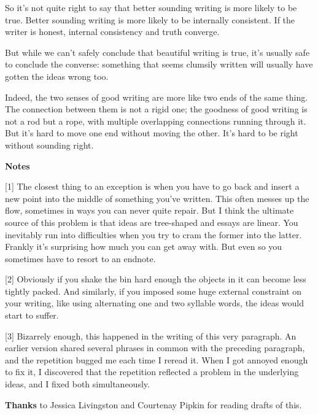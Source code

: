 So it's not quite right to say that better sounding
writing is more likely to be true. Better sounding
writing is more likely to be internally consistent. If
the writer is honest, internal consistency and truth
converge.

But while we can't safely conclude that beautiful writing
is true, it's usually safe to conclude the converse:
something that seems clumsily written will usually have
gotten the ideas wrong too.

Indeed, the two senses of good writing are more like two
ends of the same thing. The connection between them is
not a rigid one; the goodness of good writing is not a
rod but a rope, with multiple overlapping connections
running through it. But it's hard to move one end without
moving the other. It's hard to be right without sounding
right.












\textbf{Notes}

[1]
The closest thing to an exception is when you have
to go back and insert a new point into the middle of
something you've written. This often messes up the flow,
sometimes in ways you can never quite repair. But I think
the ultimate source of this problem is that ideas are
tree-shaped and essays are linear. You inevitably run
into difficulties when you try to cram the former into
the latter. Frankly it's surprising how much you can get
away with. But even so you sometimes have to resort to an
endnote.

[2]
Obviously if you shake the bin hard enough the
objects in it can become less tightly packed. And
similarly, if you imposed some huge external constraint
on your writing, like using alternating one and two
syllable words, the ideas would start to suffer.

[3]
Bizarrely enough, this happened in the writing of
this very paragraph. An earlier version shared several
phrases in common with the preceding paragraph, and the
repetition bugged me each time I reread it. When I got
annoyed enough to fix it, I discovered that the
repetition reflected a problem in the underlying ideas,
and I fixed both simultaneously.




\textbf{Thanks} to Jessica Livingston 
and Courtenay Pipkin for reading drafts of this.




